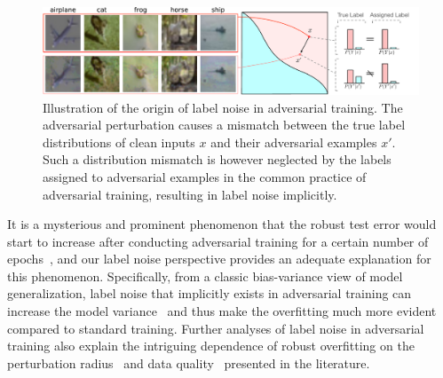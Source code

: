 \begin{figure}[tp]
  \centering
  \includegraphics[width=1.00\textwidth]{figures/implicitLabelNoise.pdf}
  \vspace{-1ex}
  \caption{Illustration of the origin of label noise in adversarial training. 
  The adversarial perturbation causes a mismatch between the true label distributions of clean inputs $x$ and their adversarial examples $x'$. Such a distribution mismatch is however neglected by the labels assigned to adversarial examples in the common practice of adversarial training, resulting in label noise implicitly.
  }
 \vspace{-2ex}
\label{fig:illustration}
\end{figure}

It is a mysterious and prominent phenomenon that the robust test error would start to increase after conducting adversarial training for a certain number of epochs~\citep{Rice2020OverfittingIA}, and our label noise perspective provides an adequate explanation for this phenomenon. 
Specifically, from a classic bias-variance view of model generalization, label noise that implicitly exists in adversarial training can increase the model variance~\citep{Yang2020RethinkingBT} and thus make the overfitting much more evident compared to standard training.
Further analyses of label noise in adversarial training also explain the intriguing dependence of robust overfitting on the perturbation radius~\citep{Dong2021ExploringMI} and data quality~\citep{Dong2021DataPF} presented in the literature. 


